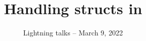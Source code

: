 \documentclass{lt}
\title[struct in \texttt{Go2Pins}]{Handling structs in \gotopins}
\date[LT 09-03-2022]{Lightning talks -- March 9, 2022}
\begin{document}
\titleframe






\bibframe


\end{document}
